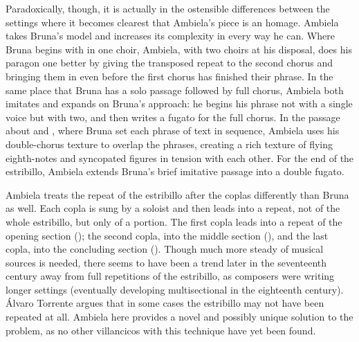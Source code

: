 Paradoxically, though, it is actually in the ostensible differences between the
settings where it becomes clearest that Ambiela's piece is an homage.
Ambiela takes Bruna's model and increases its complexity in every way he can.
Where Bruna begins with  in one choir, Ambiela, with two choirs
at his disposal, does his paragon one better by giving the transposed repeat to
the second chorus and bringing them in even before the first chorus has
finished their phrase.
In the same place that Bruna has a solo passage followed by full chorus,
Ambiela both imitates and expands on Bruna's approach: he begins his phrase not
with a single voice but with two, and then writes a fugato for the full chorus.
In the passage about  and , where Bruna set
each phrase of text in sequence, Ambiela uses his double-chorus texture to
overlap the phrases, creating a rich texture of flying eighth-notes and
syncopated figures in tension with each other.
For the end of the estribillo, Ambiela extends Bruna's brief imitative passage
into a double fugato.

Ambiela treats the repeat of the estribillo after the coplas differently than
Bruna as well.
Each copla is sung by a soloist and then leads into a repeat, not of the whole
estribillo, but only of a portion.
The first copla leads into a repeat of the
opening section (); the second copla, into the middle section
(), and the last copla, into the concluding section
().
Though much more steady of musical sources is needed, there seems to have been
a trend later in the seventeenth century away from full repetitions of the
estribillo, as composers were writing longer settings (eventually developing
multisectional  in the eighteenth century).
Álvaro Torrente argues that in some cases the estribillo may not have been
repeated at all.%
Ambiela here provides a novel and possibly unique solution to the problem, as
no other villancicos with this technique have yet been found.


